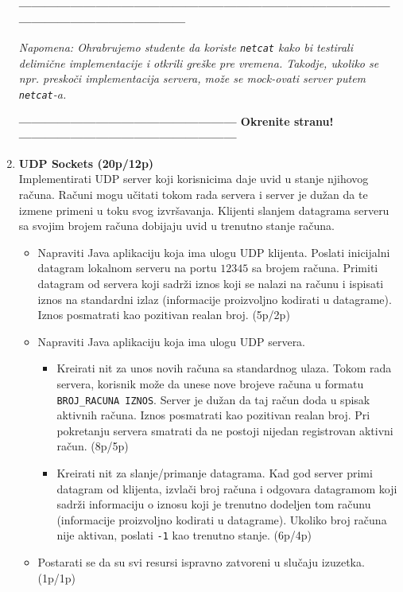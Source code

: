 \documentclass[]{article}
\begin{document}
\begin{enumerate}
\vspace{20pt}
\begin{center}
  \textbf{------------------------------------------------------------------------------------------------------------------------------}
\end{center}
\textit{Napomena: Ohrabrujemo studente da koriste \texttt{netcat} kako bi testirali delimi\v{c}ne implementacije i otkrili gre\v{s}ke pre vremena. Takodje, ukoliko se npr. presko\v{c}i implementacija servera, mo\v{z}e se mock-ovati server putem \texttt{netcat}-a.} 
\begin{center}
  \textbf{--------------------------------------------------- Okrenite stranu! ---------------------------------------------------}
\end{center}
\newpage

\item \textbf{UDP Sockets (20p/12p)}
\\Implementirati UDP server koji korisnicima daje uvid u stanje njihovog ra\v{c}una. Ra\v{c}uni mogu u\v{c}itati tokom rada servera i server je du\v{z}an da te izmene primeni u toku svog izvr\v{s}avanja. Klijenti slanjem datagrama serveru sa svojim brojem ra\v{c}una dobijaju uvid u trenutno stanje ra\v{c}una.
\begin{itemize}
  \item Napraviti Java aplikaciju koja ima ulogu UDP klijenta. Poslati inicijalni datagram lokalnom serveru na portu $12345$ sa brojem ra\v{c}una. Primiti datagram od servera koji sadr\v{z}i iznos koji se nalazi na ra\v{c}unu i ispisati iznos na standardni izlaz (informacije proizvoljno kodirati u datagrame). Iznos posmatrati kao pozitivan realan broj. \hfill (5p/2p)
  \item Napraviti Java aplikaciju koja ima ulogu UDP servera.
    \begin{itemize}
      \item Kreirati nit za unos novih ra\v{c}una sa standardnog ulaza. Tokom rada servera, korisnik mo\v{z}e da unese nove brojeve ra\v{c}una u formatu \texttt{BROJ\_RACUNA IZNOS}. Server je du\v{z}an da taj ra\v{c}un doda u spisak aktivnih ra\v{c}una. Iznos posmatrati kao pozitivan realan broj. Pri pokretanju servera smatrati da ne postoji nijedan registrovan aktivni ra\v{c}un. \hfill (8p/5p)
      \item Kreirati nit za slanje/primanje datagrama. Kad god server primi datagram od klijenta, izvla\v{c}i broj ra\v{c}una i odgovara datagramom koji sadr\v{z}i informaciju o iznosu koji je trenutno dodeljen tom ra\v{c}unu (informacije proizvoljno kodirati u datagrame). Ukoliko broj ra\v{c}una nije aktivan, poslati \texttt{-1} kao trenutno stanje. \hfill (6p/4p)
    \end{itemize}
  \item Postarati se da su svi resursi ispravno zatvoreni u slu\v{c}aju izuzetka. \hfill (1p/1p)
\end{itemize}


\end{enumerate}
\end{document}
